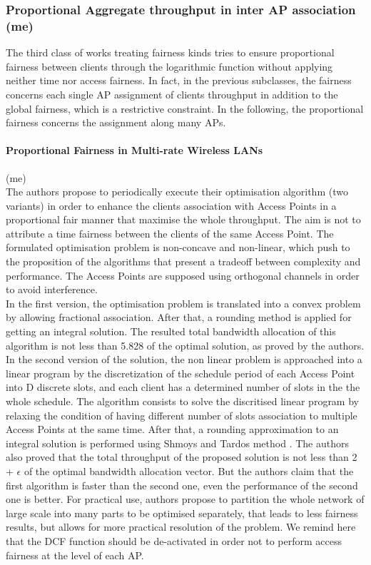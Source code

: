 \documentclass[journal,transmag]{IEEEtran}
\begin{document}
\subsubsection{Proportional Aggregate throughput in inter AP association (me)}
The third class of works treating fairness kinds tries to ensure proportional fairness between clients through the logarithmic function without applying neither time nor access fairness. In fact, in the previous subclasses, the fairness concerns each single AP assignment of clients throughput in addition to the global fairness, which is a restrictive constraint. In the following, the proportional fairness concerns the assignment along many APs. 

\paragraph{Proportional Fairness in Multi-rate Wireless LANs} (me)
\cite{08proportional_fairness_multiRate_LAN,06proportional_fairness_3G_networks}\\

The authors propose to periodically execute their optimisation algorithm (two variants) in order to enhance the clients association with Access Points in a proportional fair manner that maximise the whole throughput. The aim is not to attribute a time fairness between the clients of the same Access Point. The formulated optimisation problem is non-concave and non-linear, which push to the proposition of the algorithms that present a tradeoff between complexity and performance. The Access Points are supposed using orthogonal channels in order to avoid interference.\\
In the first version, the optimisation problem is translated into a convex problem by allowing fractional association. After that, a rounding method is applied for getting an integral solution.  The resulted total bandwidth allocation of this algorithm is not less than 5.828 of the optimal solution, as proved by the authors.  
In the second version of the solution, the non linear problem is approached into a linear program by the discretization of the schedule period of each Access Point into D discrete slots, and each client has a determined number of slots in the the whole schedule. The algorithm consists to solve the discritised linear program by relaxing the condition of having different number of slots association to multiple Access Points at the same time. After that, a rounding approximation to an integral solution is performed using Shmoys and Tardos method \cite{93general_assignment_approximation}. The authors also proved that the total throughput of the proposed solution is not less than 2 + $\epsilon$ of the optimal bandwidth allocation vector. But the authors claim that the first algorithm is faster than the second one, even the performance of the second one is better. For practical use, authors propose to partition the whole network of large scale into many parts to be optimised separately, that leads to less fairness results, but allows for more practical resolution of the problem. We remind here that the DCF function should be de-activated in order not to perform access fairness at the level of each AP. \\
\end{document}
